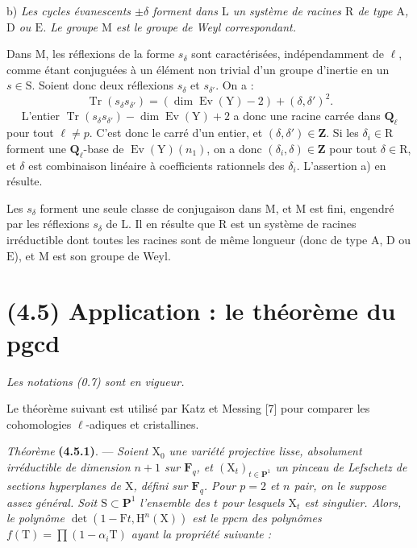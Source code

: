 \documentclass[11pt,leqno]{article}
\newcommand{\Page}[1]{\ifvmode\noindent\else\unskip\ \fi{\footnotesize\textcolor{gray}{[p.\,#1]}}\ \ignorespaces}
\begin{document}
b) \textit{Les cycles évanescents \(\pm\delta\) forment dans \(\mathrm{L}\) un système de racines \(\mathrm{R}\) de type \(\mathrm{A}\), \(\mathrm{D}\) ou \(\mathrm{E}\). Le groupe \(\mathrm{M}\) est le groupe de Weyl correspondant.}

Dans \(\mathrm{M}\), les réflexions de la forme \(s_\delta\) sont caractérisées, indépendamment de \(\ell\), comme étant conjuguées à un élément non trivial d’un groupe d’inertie en un \(s\in\mathrm{S}\). Soient donc deux réflexions \(s_\delta\) et \(s_{\delta'}\). On a :
\[
\operatorname{Tr}(s_\delta s_{\delta'})
=(\dim\operatorname{Ev}(\mathrm{Y})-2)+(\delta,\delta')^2.
\]
\Page{231}
L’entier \(\operatorname{Tr}(s_\delta s_{\delta'})-\dim\operatorname{Ev}(\mathrm{Y})+2\) a donc une racine carrée dans \(\mathbf{Q}_\ell\) pour tout \(\ell\neq p\). C’est donc le carré d’un entier, et \((\delta,\delta')\in\mathbf{Z}\). Si les \(\delta_i\in\mathrm{R}\) forment une \(\mathbf{Q}_\ell\)-base de \(\operatorname{Ev}(\mathrm{Y})(n_1)\), on a donc \((\delta_i,\delta)\in\mathbf{Z}\) pour tout \(\delta\in\mathrm{R}\), et \(\delta\) est combinaison linéaire à coefficients rationnels des \(\delta_i\). L’assertion a) en résulte.

Les \(s_\delta\) forment une seule classe de conjugaison dans \(\mathrm{M}\), et \(\mathrm{M}\) est fini, engendré par les réflexions \(s_\delta\) de \(\mathrm{L}\). Il en résulte que \(\mathrm{R}\) est un système de racines irréductible dont toutes les racines sont de même longueur (donc de type \(\mathrm{A}\), \(\mathrm{D}\) ou \(\mathrm{E}\)), et \(\mathrm{M}\) est son groupe de Weyl.

\section*{(4.5) Application : le théorème du pgcd}

\textit{Les notations \textup{(0.7)} sont en vigueur.}

Le théorème suivant est utilisé par Katz et Messing [7] pour comparer les cohomologies \(\ell\)-adiques et cristallines.

\textit{Théorème} \textbf{(4.5.1)}. — \textit{Soient \(\mathrm{X}_0\) une variété projective lisse, absolument irréductible de dimension \(n+1\) sur \(\mathbf{F}_q\), et \((\mathrm{X}_t)_{t\in\mathbf{P}^1}\) un pinceau de Lefschetz de sections hyperplanes de \(\mathrm{X}\), défini sur \(\mathbf{F}_q\). Pour \(p=2\) et \(n\) pair, on le suppose assez général. Soit \(\mathrm{S}\subset\mathbf{P}^1\) l’ensemble des \(t\) pour lesquels \(\mathrm{X}_t\) est singulier. Alors, le polynôme \(\det(1-\mathrm{F}t,\mathrm{H}^n(\mathrm{X}))\) est le ppcm des polynômes \(f(\mathrm{T})=\prod(1-\alpha_i\mathrm{T})\) ayant la propriété suivante :}
\end{document}

